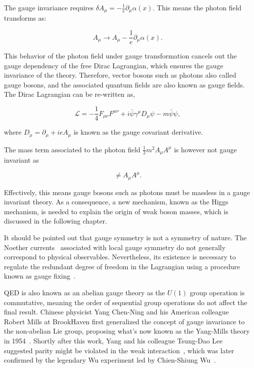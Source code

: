 The gauge invariance requires $\delta A_{\mu}=-\frac{1}{e}\partial_{\mu}\alpha(x)$. This means the photon field transforms as:

\begin{equation}
A_{\mu}\rightarrow A_{\mu}-\frac{1}{e}\partial_{\mu}\alpha(x).
\end{equation}

This behavior of the photon field under gauge transformation cancels out the gauge dependency of the free Dirac Lagrangian, which ensures the gauge invariance of the theory. Therefore, vector bosons such as photons also called gauge bosons, and the associated quantum fields are also known as gauge fields. The Dirac Lagrangian can be re-written as,

\begin{equation}
\label{eq:QEDCov}
\mathcal{L}=-\frac{1}{4}F_{\mu\nu}F^{\mu\nu}+i\bar{\psi}\gamma^{\mu}D_{\mu}\psi-m\bar{\psi}\psi,
\end{equation}

where $D_{\mu}=\partial_{\mu}+ieA_{\mu}$ is known as the gauge covariant derivative. 

The mass term associated to the photon field $\frac{1}{2}m^2A_{\mu}A^{\mu}$ is however not gauge invariant as

\begin{equation}
[A_{\mu}-\frac{1}{e}\partial_{\mu}\alpha(x)][A^{\mu}-\frac{1}{e}\partial^{\mu}\alpha(x)]\neq A_{\mu}A^{\mu}.
\end{equation}

Effectively, this means gauge bosons such as photons must be massless in a gauge invariant theory. As a consequence, a new mechanism, known as the Higgs mechanism, is needed to explain the origin of weak boson masses, which is discussed in the following chapter. 

It should be pointed out that gauge symmetry is not a symmetry of nature. The Noether currents~\cite{Noether1918} associated with local gauge symmetry do not generally correspond to physical observables. Nevertheless, its existence is necessary to regulate the redundant degree of freedom in the Lagrangian using a procedure known as gauge fixing~\cite{SCHWARTZ}. 

\ac{QED} is also known as an abelian gauge theory as the $U(1)$ group operation is commutative, meaning the order of sequential group operations do not affect the final result. Chinese physicist Yang Chen-Ning and his American colleague Robert Mills at BrookHaven first generalized the concept of gauge invariance to the non-abelian Lie group, proposing what's now known as the Yang-Mills theory in 1954~\cite{Yang:1954ek}. Shortly after this work, Yang and his colleague Tsung-Dao Lee suggested parity might be violated in the weak interaction~\cite{Lee:1956qn}, which was later confirmed by the legendary Wu experiment led by Chien-Shiung Wu~\cite{Wu:1957my}. 

